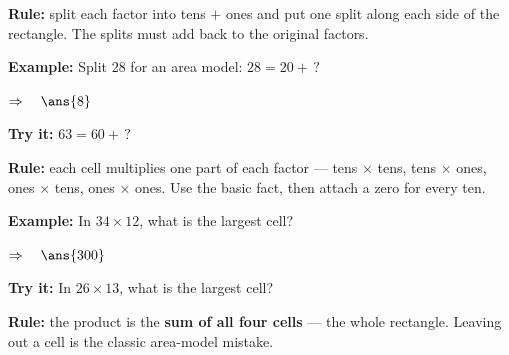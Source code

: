 \documentclass[12pt]{article}
\begin{document}


\begin{formulabox}
\textbf{Rule:} split each factor into tens $+$ ones and put one split along
each side of the rectangle. The splits must add back to the original factors.
\end{formulabox}

\begin{examplebox}
\textbf{Example:} \quad Split 28 for an area model: $28 = 20 + \,?$

$\Rightarrow\quad \ans{8}$
\end{examplebox}

\begin{tryitbox}
\textbf{Try it:} \quad $63 = 60 + \,?$\\[2pt]
\end{tryitbox}


\begin{formulabox}
\textbf{Rule:} each cell multiplies one part of each factor --- tens
$\times$ tens, tens $\times$ ones, ones $\times$ tens, ones $\times$ ones.
Use the basic fact, then attach a zero for every ten.
\end{formulabox}

\begin{examplebox}
\textbf{Example:} \quad In $34 \times 12$, what is the largest cell?

$\Rightarrow\quad \ans{300}$
\end{examplebox}

\begin{tryitbox}
\textbf{Try it:} \quad In $26 \times 13$, what is the largest cell?\\[2pt]
\end{tryitbox}


\begin{formulabox}
\textbf{Rule:} the product is the \textbf{sum of all four cells} --- the whole
rectangle. Leaving out a cell is the classic area-model mistake.
\end{formulabox}
\end{document}

